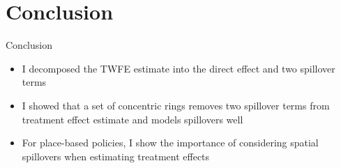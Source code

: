 \documentclass[aspectratio=169]{beamer}
\begin{document}
\section{Conclusion}

\begin{frame}{Conclusion}
    \begin{itemize}
        \item I decomposed the TWFE estimate into the direct effect and two spillover terms
        
        \item I showed that a set of concentric rings removes two spillover terms from treatment effect estimate and models spillovers well
        
        \item For place-based policies, I show the importance of considering spatial spillovers when estimating treatment effects
    \end{itemize}
\end{frame}
\end{document}
